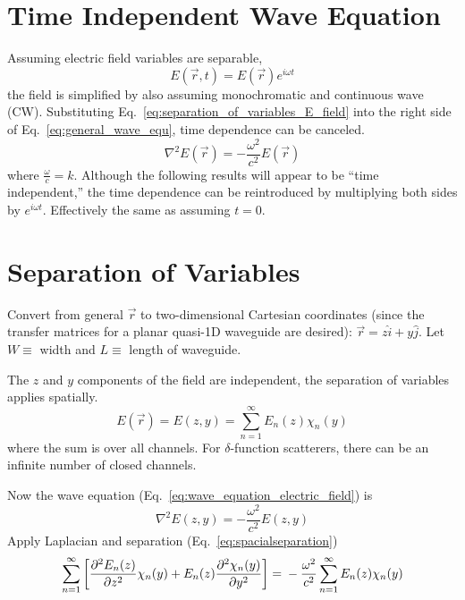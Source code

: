 \section{Time Independent Wave Equation}
Assuming electric field variables are separable,
\begin{equation}
E(\vec{r},t) = E(\vec{r}) e^{i\omega t}
\label{eq:separation_of_variables_E_field}
\end{equation}
the field is simplified by also assuming monochromatic and continuous wave (CW). Substituting  Eq.~\ref{eq:separation_of_variables_E_field} into the right side of Eq.~\ref{eq:general_wave_equ}, time dependence can be canceled. 
\begin{equation}
\nabla^2 E(\vec{r}) = - \frac{\omega^2}{c^2} E(\vec{r})
\label{eq:wave_equation_electric_field}
\end{equation}
where $\frac{\omega}{c}=k$. Although the following results will appear to be ``time independent,'' the time dependence can be reintroduced by multiplying both sides by $e^{i\omega t}$. Effectively the same as assuming $t=0$. 


\section{Separation of Variables}
Convert from general $\vec{r}$ to two-dimensional Cartesian coordinates (since the transfer matrices for a planar quasi-1D waveguide are desired): $\vec{r} = z \hat{i}+y\hat{j}$. Let $W \equiv$ width and $L \equiv$ length of waveguide.

The $z$ and $y$ components of the field are independent, the separation of variables applies spatially.
\begin{equation}
E(\vec{r}) = E(z,y) = \sum^\infty_{n=1} E_n(z) \chi_n(y)
\label{eq:spacialseparation}
\end{equation}
where the sum is over all channels. For $\delta$-function scatterers, there can be an infinite number of closed channels.

Now the wave equation (Eq.~\ref{eq:wave_equation_electric_field}) is 
\begin{equation}
\nabla^2 E(z,y) = - \frac{\omega^2}{c^2} E(z,y)
\label{eq:wave_equation_electric_field_cartesian}
\end{equation}
Apply Laplacian %
and separation (Eq.~\ref{eq:spacialseparation})
\begin{equation}
\sum^\infty_{n=1} \left[ \frac{\partial^2E_n(z)}{\partial z^2} \chi_n(y) + E_n(z) \frac{\partial^2 \chi_n(y)}{\partial y^2} \right] = \\
- \frac{\omega^2}{c^2} \sum^\infty_{n=1} E_n(z) \chi_n(y)
\label{eq:summation_variable_separation_cartesian}
\end{equation}

